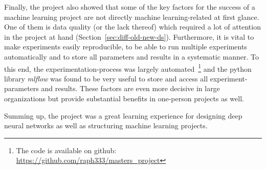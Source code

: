 Finally, the project also showed that some of the key factors for the success of a machine learning project are not directly machine learning-related at first glance. One of them is data quality (or the lack thereof) which required a lot of attention in the project at hand (Section~\ref{sec:diff-old-new-ds}). Furthermore, it is vital to make experiments easily reproducible, to be able to run multiple experiments automatically and to store all parameters and results in a systematic manner. To this end, the experimentation-process was largely automated~\footnote{The code is available on github: \url{https://github.com/raph333/masters_project}} and the python library \textit{mlflow} was found to be very useful to store and access all experiment-parameters and results. These factors are even more decisive in large organizations but provide substantial benefits in one-person projects as well.

Summing up, the project was a great learning experience for designing deep neural networks as well as structuring machine learning projects.